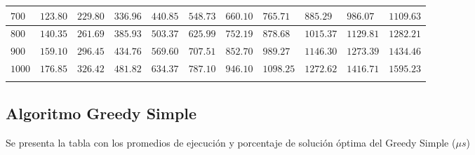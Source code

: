 \documentclass[12pt]{article}
\begin{document}
\begin{tabu}{|@{}*{11}{p{1.4cm}@{}|}}
$700$ & $123.80$ & $229.80$ & $336.96$ & $440.85$ & $548.73$ & $660.10$ & $765.71$ & $885.29$ & $986.07$ & $1109.63$ \\\hline
$800$ & $140.35$ & $261.69$ & $385.93$ & $503.37$ & $625.99$ & $752.19$ & $878.68$ & $1015.37$ & $1129.81$ & $1282.21$ \\\hline
$900$ & $159.10$ & $296.45$ & $434.76$ & $569.60$ & $707.51$ & $852.70$ & $989.27$ & $1146.30$ & $1273.39$ & $1434.46$ \\\hline
$1000$ & $176.85$ & $326.42$ & $481.82$ & $634.37$ & $787.10$ & $946.10$ & $1098.25$ & $1272.62$ & $1416.71$ & $1595.23$ \\\hline
{}%
\end{tabu}
\pagebreak
\subsection*{Algoritmo Greedy Simple}
Se presenta la tabla con los promedios de ejecuci\'on y porcentaje de soluci\'on \'optima del Greedy Simple ($\mu s$)\\
\end{document}
